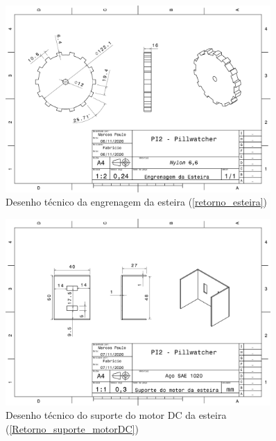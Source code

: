 \begin{apendicesenv}
\begin{figure}[H]
    \centering
    \includegraphics[width=0.9\textwidth]{figuras/estrutura/Desenhos/Engrenagem_Esteira.pdf}
    \caption{Desenho técnico da engrenagem da esteira (\ref{retorno_esteira})}
    \label{fig:engrenagem_esteira}
\end{figure}

\begin{figure}[H]
    \centering
    \includegraphics[width=0.9\textwidth]{figuras/estrutura/Desenhos/Suporte_MotorDC.pdf}
    \caption{Desenho técnico do suporte do motor DC da esteira (\ref{Retorno_suporte_motorDC})}
    \label{fig:supp_motordc}
\end{figure}


\end{apendicesenv}
